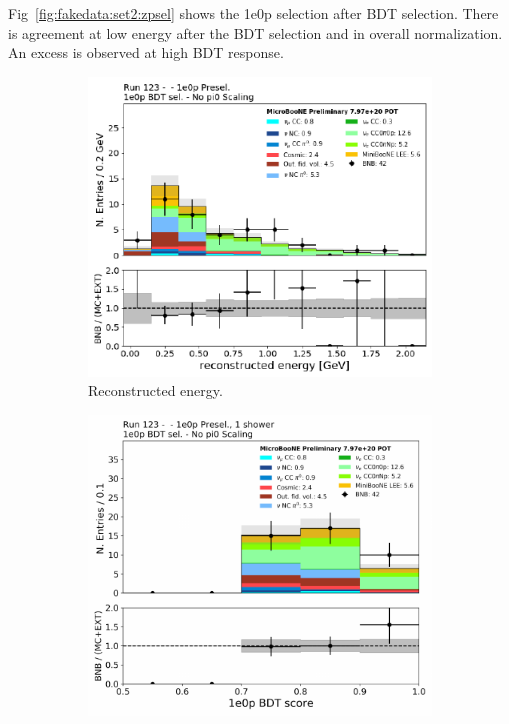 Fig~\ref{fig:fakedata:set2:zpsel} shows the 1e0p selection after BDT selection.  There is agreement at low energy after the BDT selection and in overall normalization. An excess is observed at high BDT response.

\begin{figure}[H] 
\begin{center}
    \begin{subfigure}[b]{0.3\textwidth}
    \centering
    \includegraphics[width=1.00\textwidth]{Fakedata/set2/zp_postsel_recoe.pdf}
    \caption{\label{fig:fakedata:set2:zp_postsel_recoe} Reconstructed energy.}
    \end{subfigure}
    \begin{subfigure}[b]{0.3\textwidth}
    \centering
    \includegraphics[width=1.00\textwidth]{Fakedata/set2/zp_postsel_bdt.pdf}

\end{subfigure}
\end{center}
\end{figure}
